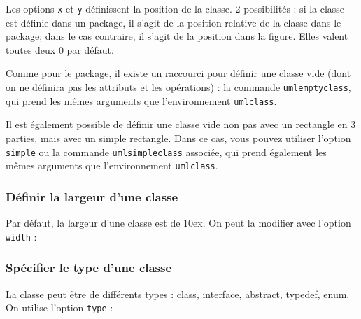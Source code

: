 \documentclass[a4paper,11pt]{report}
\newcommand{\inputTikZ}[1]{%
  }%
\newcommand{\inputTikZ}[1]{%
    \texttt{[image: fig/\#1.pdf]}%
  }%
\begin{document}
Les options {\tt x} et {\tt y} définissent la position de la classe. 2 possibilités : si la classe est définie dans un package, il s'agit de la position relative de la classe dans le package; dans le cas contraire, il s'agit de la position dans la figure. Elles valent toutes deux 0 par défaut. 

Comme pour le package, il existe un raccourci pour définir une classe vide (dont on ne définira pas les attributs et les opérations) : la commande {\tt umlemptyclass}, qui prend les mêmes arguments que l'environnement {\tt umlclass}.

Il est également possible de définir une classe vide non pas avec un rectangle en 3 parties, mais avec un simple rectangle. Dans ce cas, vous pouvez utiliser l'option {\tt simple} ou la commande {\tt umlsimpleclass} associée, qui prend également les mêmes arguments que l'environnement {\tt umlclass}.

\subsubsection{Définir la largeur d'une classe}

Par défaut, la largeur d'une classe est de 10ex. On peut la modifier avec l'option {\tt width} :

\medskip

\begin{minipage}{0.5\textwidth}

\end{minipage}
\begin{minipage}{0.4\textwidth}
\begin{center}
\inputTikZ{classwidth}
\end{center}
\end{minipage}

\subsubsection{Spécifier le type d'une classe}

La classe peut être de différents types : class, interface, abstract, typedef, enum. On utilise l'option {\tt type} :

\medskip

\begin{minipage}{0.5\textwidth}

\end{minipage}
\begin{minipage}{0.4\textwidth}
\begin{center}
\inputTikZ{classtype}
\end{center}
\end{minipage}
\end{document}
